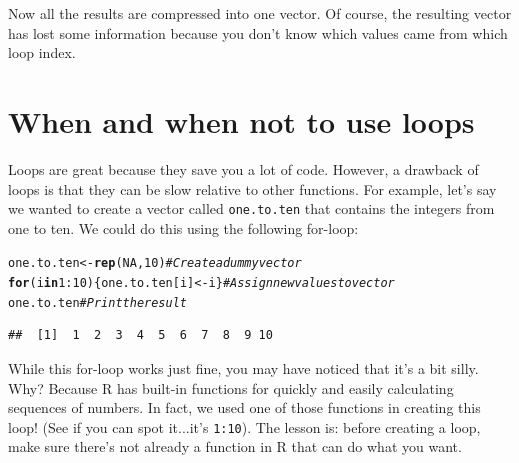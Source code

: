 \documentclass{tufte-book}\usepackage[]{graphicx}\usepackage[]{color}
\makeatletter
\newcommand{\hlnum}[1]{\textcolor[rgb]{0.686,0.059,0.569}{#1}}%
\newcommand{\hlcom}[1]{\textcolor[rgb]{0.678,0.584,0.686}{\textit{#1}}}%
\newcommand{\hlopt}[1]{\textcolor[rgb]{0,0,0}{#1}}%
\newcommand{\hlstd}[1]{\textcolor[rgb]{0.345,0.345,0.345}{#1}}%
\newcommand{\hlkwa}[1]{\textcolor[rgb]{0.161,0.373,0.58}{\textbf{#1}}}%
\newcommand{\hlkwb}[1]{\textcolor[rgb]{0.69,0.353,0.396}{#1}}%
\newcommand{\hlkwd}[1]{\textcolor[rgb]{0.737,0.353,0.396}{\textbf{#1}}}%
\newenvironment{kframe}{%
 \def\at@end@of@kframe{}%
 \ifinner\ifhmode%
  \def\at@end@of@kframe{\end{minipage}}%
  \begin{minipage}{\columnwidth}%
 \fi\fi%
 \def\FrameCommand##1{\hskip\@totalleftmargin \hskip-\fboxsep
 \colorbox{shadecolor}{##1}\hskip-\fboxsep
     \hskip-\linewidth \hskip-\@totalleftmargin \hskip\columnwidth}%
 \MakeFramed {\advance\hsize-\width
   \@totalleftmargin\z@ \linewidth\hsize
   \@setminipage}}%
 {\par\unskip\endMakeFramed%
 \at@end@of@kframe}
\newenvironment{knitrout}{}{} %
\makeatother
\begin{document}
Now all the results are compressed into one vector. Of course, the resulting vector has lost some information because you don't know which values came from which loop index.



\section{When and when not to use loops}

Loops are great because they save you a lot of code. However, a drawback of loops is that they can be slow relative to other functions. For example, let's say we wanted to create a vector called \texttt{one.to.ten} that contains the integers from one to ten. We could do this using the following for-loop:

\begin{knitrout}
\color{fgcolor}\begin{kframe}
\begin{alltt}
\hlstd{one.to.ten} \hlkwb{<-} \hlkwd{rep}\hlstd{(}\hlnum{NA}\hlstd{,} \hlnum{10}\hlstd{)} \hlcom{# Create a dummy vector}
\hlkwa{for} \hlstd{(i} \hlkwa{in} \hlnum{1}\hlopt{:}\hlnum{10}\hlstd{) \{one.to.ten[i]} \hlkwb{<-} \hlstd{i\}} \hlcom{# Assign new values to vector}
\hlstd{one.to.ten} \hlcom{# Print the result}
\end{alltt}
\begin{verbatim}
##  [1]  1  2  3  4  5  6  7  8  9 10
\end{verbatim}
\end{kframe}
\end{knitrout}

While this for-loop works just fine, you may have noticed that it's a bit silly. Why? Because R has built-in functions for quickly and easily calculating sequences of numbers. In fact, we used one of those functions in creating this loop! (See if you can spot it...it's \texttt{1:10}). The lesson is: before creating a loop, make sure there's not already a function in R that can do what you want.
\end{document}
